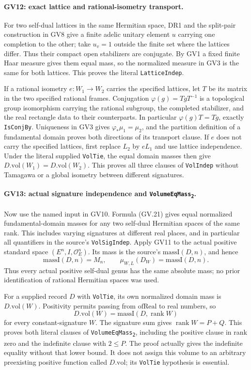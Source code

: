 \paragraph{GV12: exact lattice and rational-isometry transport.}
For two self-dual lattices in the same Hermitian space, DR1 and the
split-pair construction in GV8 give a finite adelic unitary element
$u$ carrying one completion to the other; take $u_v=1$ outside the
finite set where the lattices differ. Thus their compact open
stabilizers are conjugate. By GV1 a fixed finite Haar measure gives
them equal mass, so the normalized measure in GV3 is the same for
both lattices. This proves the literal \texttt{LatticeIndep}.

If a rational isometry $e:W_1\to W_2$ carries the specified lattices,
let $T$ be its matrix in the two specified rational frames.
Conjugation $\varphi(g)=TgT^{-1}$ is a topological group isomorphism
carrying the rational subgroup, the completed stabilizer, and the
real rectangle data to their counterparts. In particular
$\varphi(g)T=Tg$, exactly \texttt{IsConjBy}. Uniqueness in GV3 gives
$\varphi_*\mu_1=\mu_2$, and the partition definition of a fundamental
domain proves both directions of its transport clause. If $e$ does
not carry the specified lattices, first replace $L_2$ by $eL_1$ and
use lattice independence. Under the literal supplied \texttt{VolTie},
the equal domain masses then give $D.\mathrm{vol}(W_1)=D.\mathrm{vol}(W_2)$.
This proves all three clauses of \texttt{VolIndep} without Tamagawa
or a global isometry between different signatures.

\paragraph{GV13: actual signature independence and \texttt{VolumeEqMass\textsubscript{2}}.}
Now use the named input in GV10. Formula (GV.21) gives equal normalized
fundamental-domain masses for any two self-dual Hermitian spaces of
the same rank. This includes varying signatures at different real
places, and in particular all quantifiers in the source's
\texttt{VolSigIndep}. Apply GV11 to the actual positive standard
space $(E^n,I,\mathcal O_E^n)$. Its mass is the source's
$\mathrm{massI}(D,n)$, and hence
\[
          \mathrm{massI}(D,n)=M_n,\qquad
          \mu_{W,L}(D_W)=\mathrm{massI}(D,n).
 \tag{GV.25}
\]
Thus every actual positive self-dual genus has the same absolute mass;
no prior identification of rational Hermitian spaces was used.

For a supplied record $D$ with \texttt{VolTie}, its own normalized
domain mass is $D.\mathrm{vol}(W)$. Positivity permits passing from
$\mathrm{ofReal}$ to real numbers, so
\[
              D.\mathrm{vol}(W)=\mathrm{massI}(D,\operatorname{rank}W)
 \tag{GV.26}
\]
for every constant-signature $W$. The signature sum gives
$\operatorname{rank}W=P+Q$. This proves both literal clauses of
\texttt{VolumeEqMass\textsubscript{2}}, including the positive clause
in rank zero and the indefinite clause with $2\le P$.
The proof actually gives the indefinite equality without that lower
bound. It does not assign this volume to an arbitrary preexisting
positive function called $D.\mathrm{vol}$; its \texttt{VolTie}
hypothesis is essential.

